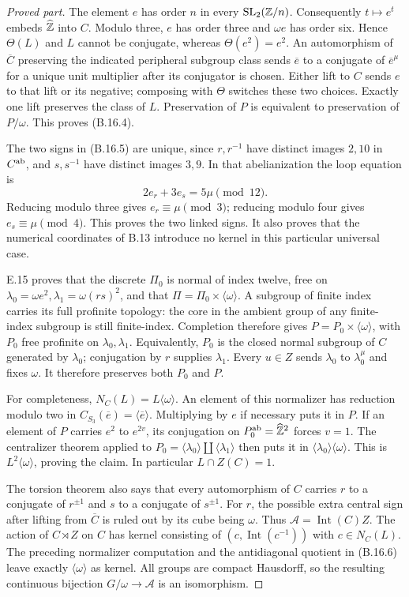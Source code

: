 \begin{proof}[Proved part]
The element $e$ has order $n$ in every $\operatorname{SL}_2(\mathbb Z/n)$.
Consequently $t\mapsto e^t$ embeds $\widehat{\mathbb Z}$ into $C$.
Modulo three, $e$ has order three and $\omega e$ has order six.
Hence $\Theta(L)$ and $L$ cannot be conjugate, whereas
$\Theta(e^2)=e^2$. An automorphism of $\overline C$ preserving
the indicated peripheral subgroup class sends $\overline e$ to a
conjugate of $\overline e^{\mu}$ for a unique unit multiplier
after its conjugator is chosen. Either lift to $C$ sends $e$ to
that lift or its negative; composing with $\Theta$ switches these
two choices. Exactly one lift preserves the class of $L$.
Preservation of $P$ is equivalent to preservation of $P/\omega$.
This proves (B.16.4).

The two signs in (B.16.5) are unique, since $r,r^{-1}$ have
distinct images $2,10$ in $C^{\rm ab}$, and $s,s^{-1}$ have
distinct images $3,9$. In that abelianization the loop equation is
\[
                 2e_r+3e_s=5\mu\pmod {12}.
\]
Reducing modulo three gives $e_r\equiv\mu\pmod3$; reducing
modulo four gives $e_s\equiv\mu\pmod4$. This proves the two
linked signs. It also proves that the numerical coordinates of
B.13 introduce no kernel in this particular universal case.

E.15 proves that the discrete $\Pi_0$ is normal of index twelve,
free on $\lambda_0=\omega e^2,\lambda_1=\omega(rs)^2$, and
that $\Pi=\Pi_0\times\langle\omega\rangle$. A subgroup of finite
index carries its full profinite topology: the core in the ambient
group of any finite-index subgroup is still finite-index.
Completion therefore gives $P=P_0\times\langle\omega\rangle$,
with $P_0$ free profinite on $\lambda_0,\lambda_1$.
Equivalently, $P_0$ is the closed normal subgroup of $C$ generated
by $\lambda_0$; conjugation by $r$ supplies $\lambda_1$.
Every $u\in Z$ sends $\lambda_0$ to $\lambda_0^\mu$ and fixes
$\omega$. It therefore preserves both $P_0$ and $P$.

For completeness, $N_C(L)=L\langle\omega\rangle$.
An element of this normalizer has reduction modulo two in
$C_{S_3}(\overline e)=\langle\overline e\rangle$.
Multiplying by $e$ if necessary puts it in $P$. If an element of
$P$ carries $e^2$ to $e^{2v}$, its conjugation on
$P_0^{\rm ab}=\widehat{\mathbb Z}^2$ forces $v=1$.
The centralizer theorem applied to
$P_0=\langle\lambda_0\rangle\amalg\langle\lambda_1\rangle$
then puts it in $\langle\lambda_0\rangle\langle\omega\rangle$.
This is $L^2\langle\omega\rangle$, proving the claim.
In particular $L\cap Z(C)=1$.

The torsion theorem also says that every automorphism of $C$
carries $r$ to a conjugate of $r^{\pm1}$ and $s$ to a conjugate
of $s^{\pm1}$. For $r$, the possible extra central sign after
lifting from $\overline C$ is ruled out by its cube being
$\omega$. Thus $\mathcal A=\operatorname{Int}(C)Z$.
The action of $C\rtimes Z$ on $C$ has kernel consisting of
$(c,\operatorname{Int}(c^{-1}))$ with $c\in N_C(L)$.
The preceding normalizer computation and the antidiagonal quotient
in (B.16.6) leave exactly $\langle\omega\rangle$ as kernel.
All groups are compact Hausdorff, so the resulting continuous
bijection $G/\omega\to\mathcal A$ is an isomorphism.


\end{proof}
